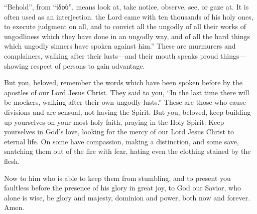 {{“Behold”, from “ἰδοὺ”, means look at, take notice, observe, see, or gaze at. It is often used as an interjection.} the Lord came with ten thousands of his holy ones,
to execute judgment on all, and to convict all the ungodly of all their works of ungodliness which they have done in an ungodly way, and of all the hard things which ungodly sinners have spoken against him.”
These are murmurers and complainers, walking after their lusts—and their mouth speaks proud things—showing respect of persons to gain advantage.
\par }{\PP {}But you, beloved, remember the words which have been spoken before by the apostles of our Lord Jesus Christ.
They said to you, “In the last time there will be mockers, walking after their own ungodly lusts.”
These are those who cause divisions and are sensual, not having the Spirit.
But you, beloved, keep building up yourselves on your most holy faith, praying in the Holy Spirit.
Keep yourselves in God’s love, looking for the mercy of our Lord Jesus Christ to eternal life.
On some have compassion, making a distinction,
and some save, snatching them out of the fire with fear, hating even the clothing stained by the flesh.
\par }{\PP {}Now to him who is able to keep them from stumbling, and to present you faultless before the presence of his glory in great joy,
to God our Savior, who alone is wise, be glory and majesty, dominion and power, both now and forever. Amen.
\par }